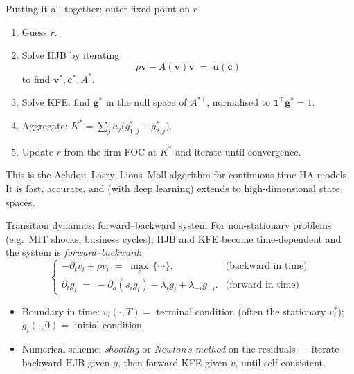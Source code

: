 \documentclass[10pt,english,aspectratio=169]{beamer}
\begin{document}
\begin{frame}{Putting it all together: outer fixed point on $r$}
\begin{enumerate}
\item Guess $r$.
\medskip
\item Solve HJB by iterating
\[
\rho \mathbf v - A(\mathbf v)\mathbf v \;=\; \mathbf u(\mathbf c)
\]
to find $\mathbf v^*, \mathbf c^*, A^*$.
\medskip
\item Solve KFE: find $\mathbf g^*$ in the null space of $A^{*\top}$, normalised to $\mathbf 1^\top \mathbf g^* = 1$.
\medskip
\item Aggregate: $K^* = \sum_j a_j \big(g^*_{1,j} + g^*_{2,j}\big)$.
\medskip
\item Update $r$ from the firm FOC at $K^*$ and iterate until convergence.
\end{enumerate}
\medskip

This is the Achdou--Lasry--Lions--Moll algorithm for continuous-time HA models. It is fast, accurate, and (with deep learning) extends to high-dimensional state spaces.
\end{frame}

\begin{frame}{Transition dynamics: forward--backward system}
For non-stationary problems (e.g.\ MIT shocks, business cycles), HJB and KFE become time-dependent and the system is \emph{forward--backward}:
\[
\begin{cases}
-\partial_t v_i + \rho v_i \;=\; \max_c\,\{\cdots\}, & \text{(backward in time)}\\[0.4em]
\partial_t g_i \;=\; -\partial_a(s_i g_i) - \lambda_i g_i + \lambda_{-i} g_{-i}. & \text{(forward in time)}
\end{cases}
\]
\medskip
\begin{itemize}
\item Boundary in time: $v_i(\cdot, T) = $ terminal condition (often the stationary $v_i^*$); $g_i(\cdot, 0) = $ initial condition.
\medskip
\item Numerical scheme: \emph{shooting} or \emph{Newton's method} on the residuals --- iterate backward HJB given $g$, then forward KFE given $v$, until self-consistent.
\end{itemize}
\end{frame}
\end{document}

